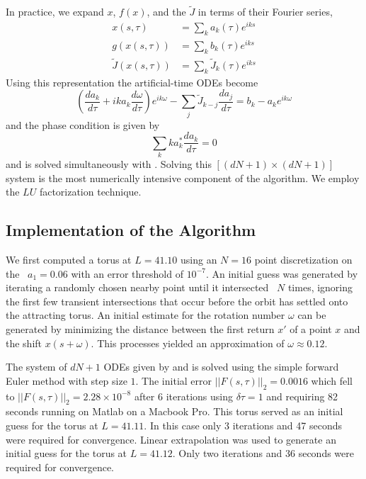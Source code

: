 \documentclass[aip,cha,reprint,
secnumarabic,
nofootinbib, tightenlines,
nobibnotes, showkeys, showpacs,
groupedaddress
]{revtex4-1}
\begin{document}
In practice, we expand $x$, $f(x)$, and the {\jacobianM} $\tilde{J}$ in terms of their Fourier series,
\begin{align}\label{eq:FExp}
x(s,\tau)&=\sum_{k} a_k(\tau) e^{i k s}\nonumber \\
g(x(s,\tau))&=\sum_{k} b_k(\tau) e^{i k s}\\
\tilde{J}(x(s,\tau))&=\sum_{k} \tilde{J}_k(\tau) e^{i k s} \nonumber
\end{align}
Using this representation the artificial-time ODEs become
\begin{equation}
\label{eq:Newton}
\left(\frac{da_k}{d\tau}+ika_k\frac{d\omega}{d\tau}\right)e^{ik\omega}-\sum_j \tilde{J}_{k-j}\frac{da_j}{d\tau}=b_k-a_ke^{ik\omega}
\end{equation}
and the phase condition  is given by
\begin{equation}
\label{eq:PhaseCond}
\sum_k ka_k^* \frac{da_k}{d\tau} =0
\end{equation}
and is solved simultaneously with .  Solving this
$[(dN+1)\!\times\!(dN+1)]$ system is the most numerically intensive component of
the algorithm.  We employ the $LU$ factorization technique.

\subsection{Implementation of the Algorithm}
We first computed a torus at $L=41.10$ using an $N=16$ point discretization on the \PoincSec\ $a_1=0.06$ with an error threshold of $10^{-7}$.  An initial guess was generated by iterating a randomly chosen nearby point until it intersected \PoincSec\ $N$ times, ignoring the first few transient intersections that occur before the orbit has settled onto the attracting torus.   An initial estimate for the rotation number $\omega$ can be generated by minimizing the distance between the first return $x'$ of a point $x$ and the shift $x(s+\omega)$.  This processes yielded an approximation of $\omega \approx 0.12$.

The system of $dN+1$ ODEs given by   and  is solved using the simple forward Euler method with step size $1$.  The initial error $||F(s,\tau)||_2= 0.0016$ which fell to $||F(s,\tau)||_2= 2.28 \times 10^{-8}$ after 6 iterations using $\delta \tau = 1$ and requiring 82 seconds running on Matlab on a Macbook Pro.   This torus served as an initial guess for the torus at $L=41.11$.  In this case only 3 iterations and 47 seconds were required for convergence.  Linear extrapolation was used to generate an initial guess for the torus at $L=41.12$.  Only two iterations and 36 seconds were required for convergence.
\end{document}
